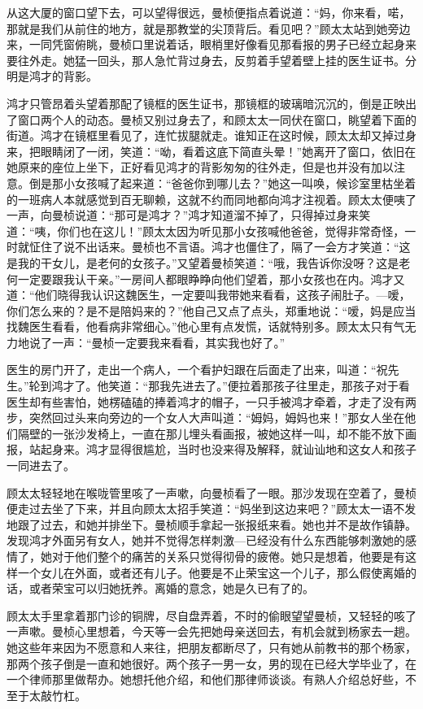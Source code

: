 \par 从这大厦的窗口望下去，可以望得很远，曼桢便指点着说道：“妈，你来看，喏，那就是我们从前住的地方，就是那教堂的尖顶背后。看见吧？”顾太太站到她旁边来，一同凭窗俯眺，曼桢口里说着话，眼梢里好像看见那看报的男子已经立起身来要往外走。她猛一回头，那人急忙背过身去，反剪着手望着壁上挂的医生证书。分明是鸿才的背影。
\par 鸿才只管昂着头望着那配了镜框的医生证书，那镜框的玻璃暗沉沉的，倒是正映出了窗口两个人的动态。曼桢又别过身去了，和顾太太一同伏在窗口，眺望着下面的街道。鸿才在镜框里看见了，连忙拔腿就走。谁知正在这时候，顾太太却又掉过身来，把眼睛闭了一闭，笑道：“呦，看着这底下简直头晕！”她离开了窗口，依旧在她原来的座位上坐下，正好看见鸿才的背影匆匆的往外走，但是也并没有加以注意。倒是那小女孩喊了起来道：“爸爸你到哪儿去？”她这一叫唤，候诊室里枯坐着的一班病人本就感觉到百无聊赖，这就不约而同地都向鸿才注视着。顾太太便咦了一声，向曼桢说道：“那可是鸿才？”鸿才知道溜不掉了，只得掉过身来笑道：“咦，你们也在这儿！”顾太太因为听见那小女孩喊他爸爸，觉得非常奇怪，一时就怔住了说不出话来。曼桢也不言语。鸿才也僵住了，隔了一会方才笑道：“这是我的干女儿，是老何的女孩子。”又望着曼桢笑道：“哦，我告诉你没呀？这是老何一定要跟我认干亲。”一房间人都眼睁睁向他们望着，那小女孩也在内。鸿才又道：“他们晓得我认识这魏医生，一定要叫我带她来看看，这孩子闹肚子。—嗳，你们怎么来的？是不是陪妈来的？”他自己又点了点头，郑重地说：“嗳，妈是应当找魏医生看看，他看病非常细心。”他心里有点发慌，话就特别多。顾太太只有气无力地说了一声：“曼桢一定要我来看看，其实我也好了。”
\par 医生的房门开了，走出一个病人，一个看护妇跟在后面走了出来，叫道：“祝先生。”轮到鸿才了。他笑道：“那我先进去了。”便拉着那孩子往里走，那孩子对于看医生却有些害怕，她楞磕磕的捧着鸿才的帽子，一只手被鸿才牵着，才走了没有两步，突然回过头来向旁边的一个女人大声叫道：“姆妈，姆妈也来！”那女人坐在他们隔壁的一张沙发椅上，一直在那儿埋头看画报，被她这样一叫，却不能不放下画报，站起身来。鸿才显得很尴尬，当时也没来得及解释，就讪讪地和这女人和孩子一同进去了。
\par 顾太太轻轻地在喉咙管里咳了一声嗽，向曼桢看了一眼。那沙发现在空着了，曼桢便走过去坐了下来，并且向顾太太招手笑道：“妈坐到这边来吧？”顾太太一语不发地跟了过去，和她并排坐下。曼桢顺手拿起一张报纸来看。她也并不是故作镇静。发现鸿才外面另有女人，她并不觉得怎样刺激—已经没有什么东西能够刺激她的感情了，她对于他们整个的痛苦的关系只觉得彻骨的疲倦。她只是想着，他要是有这样一个女儿在外面，或者还有儿子。他要是不止荣宝这一个儿子，那么假使离婚的话，或者荣宝可以归她抚养。离婚的意念，她是久已有了的。
\par 顾太太手里拿着那门诊的铜牌，尽自盘弄着，不时的偷眼望望曼桢，又轻轻的咳了一声嗽。曼桢心里想着，今天等一会先把她母亲送回去，有机会就到杨家去一趟。她这些年来因为不愿意和人来往，把朋友都断尽了，只有她从前教书的那个杨家，那两个孩子倒是一直和她很好。两个孩子一男一女，男的现在已经大学毕业了，在一个律师那里做帮办。她想托他介绍，和他们那律师谈谈。有熟人介绍总好些，不至于太敲竹杠。
